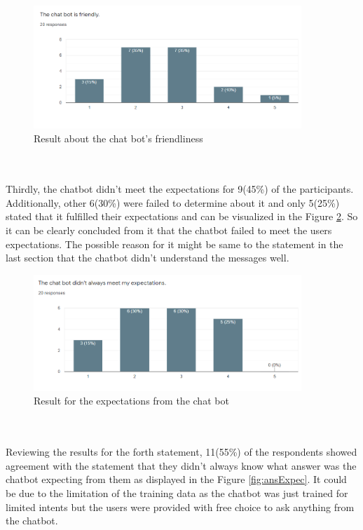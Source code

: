 \begin{figure}[!h]
    \centering
    \includegraphics[width=0.9\textwidth]{img/Friendly_Chatbot.PNG}
    \caption{Result about the chat bot's friendliness}
    \label{fig:friendlyBot}
\end{figure}
\\~\\
Thirdly, the chatbot didn't meet the expectations for 9(45\%) of the participants. Additionally, other 6(30\%) were failed to determine about it and only 5(25\%) stated that it fulfilled their expectations and can be visualized in the Figure \ref{fig:botExpec}. So it can be clearly concluded from it that the chatbot failed to meet the users expectations. The possible reason for it might be same to the statement in the last section that the chatbot didn't understand the messages well.

\begin{figure}[!h]
    \centering
    \includegraphics[width=0.9\textwidth]{img/Chatbot_Expect.PNG}
    \caption{Result for the expectations from the chat bot}
    \label{fig:botExpec}
\end{figure}
\\~\\
Reviewing the results for the forth statement, 11(55\%) of the respondents showed agreement with the statement that they didn't always know what answer was the chatbot expecting from them as displayed in the Figure \ref{fig:ansExpec}. It could be due to the limitation of the training data as the chatbot was just trained for limited intents but the users were provided with free choice to ask anything from the chatbot. 

